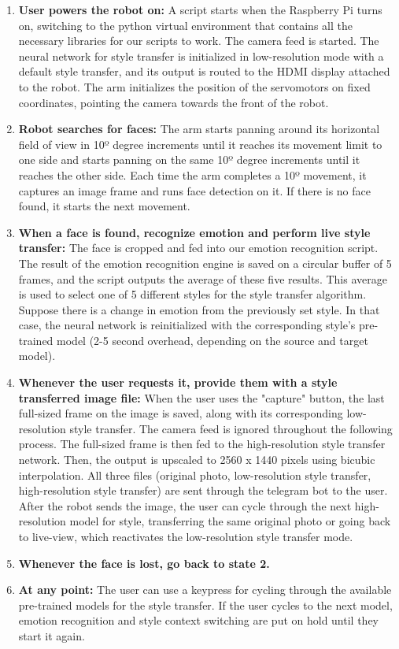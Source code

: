 \begin{enumerate}
  \item \textbf{User powers the robot on:} A script starts when the Raspberry Pi turns on, switching to the python virtual environment that contains all the necessary libraries for our scripts to work. The camera feed is started. The neural network for style transfer is initialized in low-resolution mode with a default style transfer, and its output is routed to the HDMI display attached to the robot. The arm initializes the position of the servomotors on fixed coordinates, pointing the camera towards the front of the robot.   
  \item \textbf{Robot searches for faces:} The arm starts panning around its horizontal field of view in 10º degree increments until it reaches its movement limit to one side and starts panning on the same 10º degree increments until it reaches the other side. Each time the arm completes a 10º movement, it captures an image frame and runs face detection on it. If there is no face found, it starts the next movement.
  \item \textbf{When a face is found, recognize emotion and perform live style transfer:} The face is cropped and fed into our emotion recognition script. The result of the emotion recognition engine is saved on a circular buffer of 5 frames, and the script outputs the average of these five results. This average is used to select one of 5 different styles for the style transfer algorithm. Suppose there is a change in emotion from the previously set style. In that case, the neural network is reinitialized with the corresponding style's pre-trained model (2-5 second overhead, depending on the source and target model).
  \item \textbf{Whenever the user requests it, provide them with a style transferred image file:} When the user uses the "capture" button, the last full-sized frame on the image is saved, along with its corresponding low-resolution style transfer. The camera feed is ignored throughout the following process. The full-sized frame is then fed to the high-resolution style transfer network. Then, the output is upscaled to 2560 x 1440 pixels using bicubic interpolation. All three files (original photo, low-resolution style transfer, high-resolution style transfer) are sent through the telegram bot to the user. After the robot sends the image, the user can cycle through the next high-resolution model for style, transferring the same original photo or going back to live-view, which reactivates the low-resolution style transfer mode.
  \item \textbf{Whenever the face is lost, go back to state 2.}
  \item \textbf{At any point:} The user can use a keypress for cycling through the available pre-trained models for the style transfer. If the user cycles to the next model, emotion recognition and style context switching are put on hold until they start it again.
\end{enumerate}

